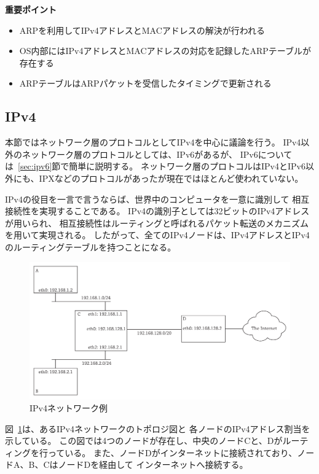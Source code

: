 \begin{itembox}[l]{\bf 重要ポイント}
    \begin{itemize}
        \item ARPを利用してIPv4アドレスとMACアドレスの解決が行われる
        \item OS内部にはIPv4アドレスとMACアドレスの対応を記録したARPテーブルが存在する
        \item ARPテーブルはARPパケットを受信したタイミングで更新される
    \end{itemize}
\end{itembox}

\subsection{IPv4} \label{sec:network}

本節ではネットワーク層のプロトコルとしてIPv4を中心に議論を行う。
IPv4以外のネットワーク層のプロトコルとしては、IPv6があるが、
IPv6については~\ref{sec:ipv6}節で簡単に説明する。
ネットワーク層のプロトコルはIPv4とIPv6以外にも、IPXなどのプロトコルがあったが現在ではほとんど使われていない。

IPv4の役目を一言で言うならば、世界中のコンピュータを一意に識別して
相互接続性を実現することである。
IPv4の識別子としては32ビットのIPv4アドレスが用いられ、
相互接続性はルーティングと呼ばれるパケット転送のメカニズムを用いて実現される。
したがって、全てのIPv4ノードは、IPv4アドレスとIPv4のルーティングテーブルを持つことになる。

\begin{figure}[tb]
    \centering
    \includegraphics[width=15cm,pagebox=artbox]{figs/routing.pdf}
    \caption{IPv4ネットワーク例}
    \label{fig:routing}
\end{figure}

図~\ref{fig:routing}は、あるIPv4ネットワークのトポロジ図と
各ノードのIPv4アドレス割当を示している。
この図では4つのノードが存在し、中央のノードCと、Dがルーティングを行っている。
また、ノードDがインターネットに接続されており、ノードA、B、CはノードDを経由して
インターネットへ接続する。

